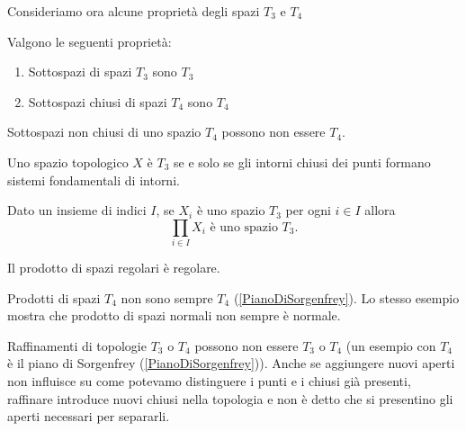 \begin{multicols*}{2}
\noindent Consideriamo ora alcune proprietà degli spazi $T_3$ e $T_4$
\begin{proposition}
Valgono le seguenti proprietà:
\begin{enumerate}[noitemsep]
\item Sottospazi di spazi $T_3$ sono $T_3$
\item Sottospazi chiusi di spazi $T_4$ sono $T_4$
\end{enumerate}
\end{proposition}
\begin{remark}
Sottospazi non chiusi di uno spazio $T_4$ possono non essere $T_4$.
\end{remark}

\begin{proposition}\label{CaratterizzazioneT3ConIntorni}
Uno spazio topologico $X$ è $T_3$ se e solo se gli intorni chiusi dei punti formano sistemi fondamentali di intorni.
\end{proposition}

\begin{proposition}
Dato un insieme di indici $I$, se $X_i$ è uno spazio $T_3$ per ogni $i\in I$ allora
\[\prod_{i\in I}X_i\text{ è uno spazio }T_3.\]
\end{proposition}
\begin{corollary}
Il prodotto di spazi regolari è regolare.
\end{corollary}

\begin{remark}
Prodotti di spazi $T_4$ non sono sempre $T_4$ (\ref{PianoDiSorgenfrey}). Lo stesso esempio mostra che prodotto di spazi normali non sempre è normale.
\end{remark}

\begin{remark}
Raffinamenti di topologie $T_3$ o $T_4$ possono non essere $T_3$ o $T_4$ (un esempio con $T_4$ è il piano di Sorgenfrey (\ref{PianoDiSorgenfrey})). Anche se aggiungere nuovi aperti non influisce su come potevamo distinguere i punti e i chiusi già presenti, raffinare introduce nuovi chiusi nella topologia e non è detto che si presentino gli aperti necessari per separarli.
\end{remark}




\end{multicols*}
